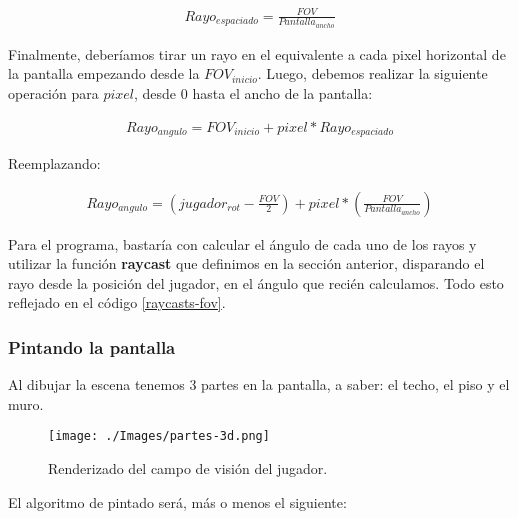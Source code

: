 \begin{equation}
\begin{aligned}
\label{foveq}
Rayo_{espaciado} = \frac{FOV}{Pantalla_{ancho}}
\end{aligned}
\end{equation}

Finalmente, deberíamos tirar un rayo en el equivalente a cada pixel horizontal de la pantalla empezando desde la $FOV_{inicio}$. Luego, debemos realizar la siguiente operación para $pixel$, desde 0 hasta el ancho de la pantalla:

\begin{equation}
\begin{aligned}
\label{eq-rayo}
Rayo_{angulo} = FOV_{inicio} + pixel * Rayo_{espaciado} 
\end{aligned}
\end{equation}

Reemplazando:

\begin{equation}
\begin{aligned}
\label{eq-rayo-2}
Rayo_{angulo} = \left(jugador_{rot} - \frac{FOV}{2} \right) + pixel * \left(\frac{FOV}{Pantalla_{ancho}}\right)
\end{aligned}
\end{equation}

Para el programa, bastaría con calcular el ángulo de cada uno de los rayos y utilizar la función \textbf{raycast} que definimos en la sección anterior, disparando el rayo desde la posición del jugador, en el ángulo que recién calculamos. Todo esto reflejado en el código \ref{raycasts-fov}.



\subsubsection{Pintando la pantalla}


Al dibujar la escena tenemos 3 partes en la pantalla, a saber: el techo, el piso y el muro.

\begin{figure}[h!]
	\centering
	\texttt{[image: ./Images/partes-3d.png]}
	\caption{Renderizado del campo de visión del jugador.}
	\label{partes-3d}
\end{figure}

El algoritmo de pintado será, más o menos el siguiente: 

